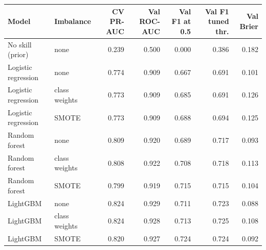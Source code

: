 \begin{tabular}{llrrrrr}
\toprule
Model & Imbalance & CV PR-AUC & Val ROC-AUC & Val F1 at 0.5 & Val F1 tuned thr. & Val Brier \\
\midrule
No skill (prior) & none & 0.239 & 0.500 & 0.000 & 0.386 & 0.182 \\
Logistic regression & none & 0.774 & 0.909 & 0.667 & 0.691 & 0.101 \\
Logistic regression & class weights & 0.773 & 0.909 & 0.685 & 0.691 & 0.126 \\
Logistic regression & SMOTE & 0.773 & 0.909 & 0.688 & 0.694 & 0.125 \\
Random forest & none & 0.809 & 0.920 & 0.689 & 0.717 & 0.093 \\
Random forest & class weights & 0.808 & 0.922 & 0.708 & 0.718 & 0.113 \\
Random forest & SMOTE & 0.799 & 0.919 & 0.715 & 0.715 & 0.104 \\
LightGBM & none & 0.824 & 0.929 & 0.711 & 0.723 & 0.088 \\
LightGBM & class weights & 0.824 & 0.928 & 0.713 & 0.725 & 0.108 \\
LightGBM & SMOTE & 0.820 & 0.927 & 0.724 & 0.724 & 0.092 \\
\bottomrule
\end{tabular}
